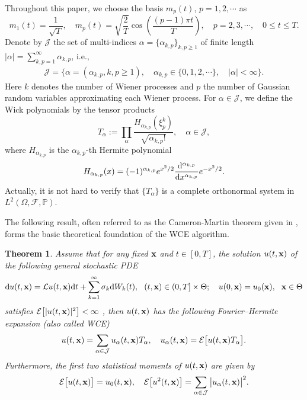 \documentclass[preprint,12pt]{article}
\newtheorem{theorem}{Theorem}[section]
\numberwithin{figure}{section}
\numberwithin{table}{section}
\numberwithin{equation}{section}
\begin{document}
Throughout this paper, we choose the basis $m_p(t)$, $p=1,2,\cdots$ as
$$m_1(t)=\frac{1}{\sqrt{T}},\quad m_p(t)=\sqrt{\frac{2}{T}}\cos\left(\frac{(p-1)\pi t}{T}\right),\quad p=2,3,\cdots,\quad 0\leq t\leq T.$$
 Denote by $\mathcal{J}$ the set of multi-indices $\alpha=\{\alpha_{k,p}\}_{k,p\geq1}$ of finite length $|\alpha|=\sum_{k,p=1}^\infty\alpha_{k,p}$, i.e.,
\begin{align*}
  \mathcal{J}=\big\{\alpha=(\alpha_{k,p}, k,p\geq1),\quad \alpha_{k,p}\in\{0,1,2,\cdots\},\quad|\alpha|<\infty\big\}.
\end{align*}
Here $k$ denotes the number of Wiener processes and $p$ the number of Gaussian random variables approximating each Wiener process. For $\alpha\in \mathcal{J}$, we define the Wick polynomials by the tensor products
\begin{equation}
	T_{\alpha}:=\prod_{\alpha}\frac{H_{\alpha_{k,p}}(\xi_{p}^{k})}{\sqrt{\alpha_{k,p}!}},\quad \alpha\in\mathcal{J},
\end{equation}
where $H_{{\alpha_{k,p}}}$ is the $\alpha_{k,p}$-th Hermite polynomial
$$H_{\alpha_{k,p}}(x)=(-1)^{\alpha_{k,p}}e^{x^2/2}\frac{{\rm d}^{\alpha_{k,p}}}{{\rm d}x^{\alpha_{k,p}}}e^{-x^2/2}.$$
Actually, it is not hard to verify that $\{T_{\alpha}\}$ is a complete orthonormal system in $L^2(\Omega,\mathcal{F},\mathbb{P})$. 

The following result, often referred to as the Cameron-Martin theorem given in \cite{RefCam}, forms the basic theoretical foundation of the WCE algorithm.
\begin{theorem}\label{WCE1}
Assume that for any fixed ${\bf x}$ and $t\in[0,T]$, the solution $u(t, \bf x)$ of the following general stochastic PDE
\begin{equation*}
{\rm d}u(t,{\bf x})=\mathcal{L}u(t,{\bf x}){\rm d}t+\sum_{k=1}^{\infty}\sigma_k{\rm d}W_k(t),~~ (t,{\bf x})\in(0,T]\times \Theta;\quad u(0,{\bf x})=u_0({\bf x}),~~ {\bf x}\in \Theta
\end{equation*}
satisfies $\mathcal{E}\big[|u(t,{\bf x})|^2\big]<\infty$ , then $u(t,{\bf x})$ has the following Fourier--Hermite expansion (also called WCE)
\begin{equation*}
u(t,{\bf x})=\sum_{\alpha\in\mathcal{J}}u_{\alpha}(t,{\bf x})T_{\alpha},\quad u_{\alpha}(t,{\bf x})=\mathcal{E}\big[u(t,{\bf x})T_{\alpha}\big].
\end{equation*}
Furthermore, the first two statistical moments of $u(t,{\bf x})$ are given by
\begin{equation*}
\mathcal{E}\big[u(t,{\bf x})\big]=u_{0}(t,{\bf x}),\quad \mathcal{E}\big[u^{2}(t,{\bf x})\big]=\sum_{\alpha\in\mathcal{J}}\big|u_{\alpha}(t,{\bf x})\big|^{2}.
\end{equation*}
\end{theorem}
\end{document}

